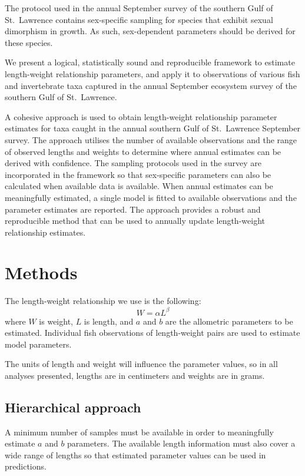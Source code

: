 \documentclass[12pt]{article}\usepackage[]{graphicx}\usepackage[]{color}
\begin{document}
The protocol used in the annual September survey of the southern Gulf of St.~Lawrence contains sex-specific sampling for species that exhibit sexual dimorphism in growth. As such, sex-dependent parameters should be derived for these species.

We present a logical, statistically sound and reproducible framework to estimate length-weight relationship parameters, and apply it to observations of various fish and invertebrate taxa captured in the annual September ecosystem survey of the southern Gulf of St.~Lawrence.

A cohesive approach is used to obtain length-weight relationship parameter estimates for taxa caught in the annual southern Gulf of St.~Lawrence September survey. The approach utilises the number of available observations and the range of observed lengths and weights to determine where annual estimates can be derived with confidence. The sampling protocols used in the survey are incorporated in the framework so that sex-specific parameters can also be calculated when available data is available. When annual estimates can be meaningfully estimated, a single model is fitted to available observations and the parameter estimates are reported. The approach provides a robust and reproducible method that can be used to annually update length-weight relationship estimates.

\hypertarget{methods}{%
\section{Methods}\label{methods}}

The length-weight relationship we use is the following: \begin{equation}
W = \alpha L^{\beta}
\end{equation} where \(W\) is weight, \(L\) is length, and \(a\) and \(b\) are the allometric parameters to be estimated.
Individual fish observations of length-weight pairs are used to estimate model parameters.

The units of length and weight will influence the parameter values, so in all analyses presented, lengths are in centimeters and weights are in grams.

\hypertarget{hierarchical-approach}{%
\subsection{Hierarchical approach}\label{hierarchical-approach}}

A minimum number of samples must be available in order to meaningfully estimate \(a\) and \(b\) parameters. The available length information must also cover a wide range of lengths so that estimated parameter values can be used in predictions.
\end{document}
